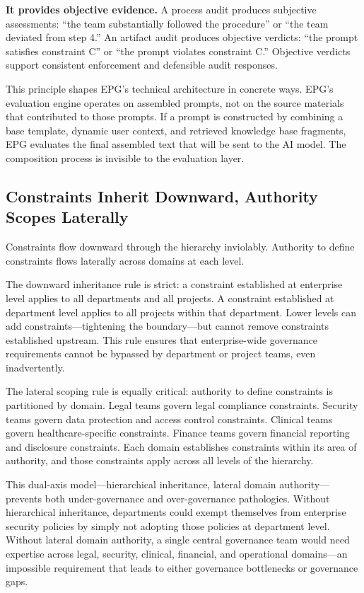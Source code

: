 \textbf{It provides objective evidence.} A process audit produces subjective assessments: ``the team substantially followed the procedure'' or ``the team deviated from step 4.'' An artifact audit produces objective verdicts: ``the prompt satisfies constraint C'' or ``the prompt violates constraint C.'' Objective verdicts support consistent enforcement and defensible audit responses.

This principle shapes EPG's technical architecture in concrete ways. EPG's evaluation engine operates on assembled prompts, not on the source materials that contributed to those prompts. If a prompt is constructed by combining a base template, dynamic user context, and retrieved knowledge base fragments, EPG evaluates the final assembled text that will be sent to the AI model. The composition process is invisible to the evaluation layer.

\subsection{Constraints Inherit Downward, Authority Scopes Laterally}


Constraints flow downward through the hierarchy inviolably. Authority to define constraints flows laterally across domains at each level.

The downward inheritance rule is strict: a constraint established at enterprise level applies to all departments and all projects. A constraint established at department level applies to all projects within that department. Lower levels can add constraints---tightening the boundary---but cannot remove constraints established upstream. This rule ensures that enterprise-wide governance requirements cannot be bypassed by department or project teams, even inadvertently.

The lateral scoping rule is equally critical: authority to define constraints is partitioned by domain. Legal teams govern legal compliance constraints. Security teams govern data protection and access control constraints. Clinical teams govern healthcare-specific constraints. Finance teams govern financial reporting and disclosure constraints. Each domain establishes constraints within its area of authority, and those constraints apply across all levels of the hierarchy.

This dual-axis model---hierarchical inheritance, lateral domain authority---prevents both under-governance and over-governance pathologies. Without hierarchical inheritance, departments could exempt themselves from enterprise security policies by simply not adopting those policies at department level. Without lateral domain authority, a single central governance team would need expertise across legal, security, clinical, financial, and operational domains---an impossible requirement that leads to either governance bottlenecks or governance gaps.

